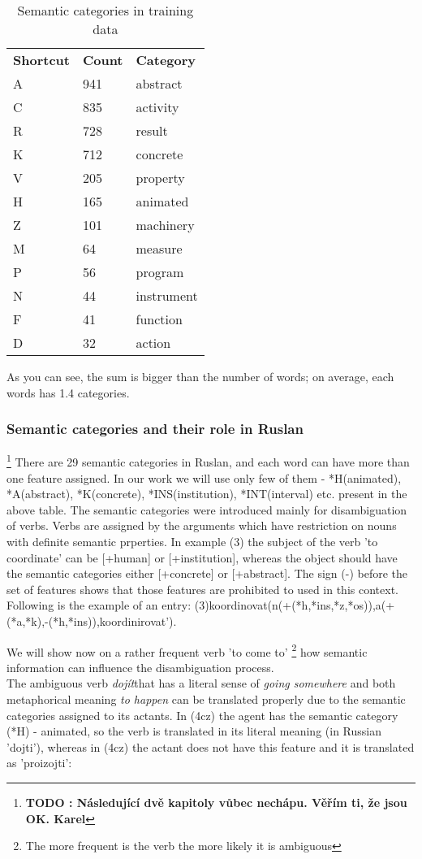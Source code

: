 \documentclass[letterpaper]{article}
\newcommand{\todofn}[1] {
 \footnote{\textbf{TODO : #1}}}
\begin{document}
\begin{table}
\begin{tabular}{|l|l|l|}
 \hline
\textbf{Shortcut} &  \textbf{Count} & \textbf{Category}\\
A & 941 & abstract \\ \hline
C & 835 & activity \\ \hline
R & 728 & result \\ \hline
K & 712 & concrete \\ \hline
V & 205 & property \\ \hline
H & 165 & animated \\ \hline
Z & 101 & machinery \\ \hline
M & 64 & measure\\ \hline
P & 56 & program \\ \hline
N & 44 & instrument \\ \hline
F & 41 & function \\ \hline
D & 32 & action \\ \hline

\end{tabular}
\caption{Semantic categories in training data}
\end{table}


As you can see, the sum is bigger than the number of words; on average, each words has 1.4 categories.


\subsubsection{Semantic categories and their role in Ruslan}
\todofn{Následující dvě kapitoly vůbec nechápu. Věřím ti, že jsou OK. Karel} 
There are 29 semantic categories in Ruslan, and each word can have more than one
feature assigned. In our work we will use only few of them - *H(animated), *A(abstract),
*K(concrete), *INS(institution), *INT(interval) etc. present in the above table.
The semantic categories were introduced mainly for disambiguation of verbs.
Verbs are assigned by the arguments which have restriction on nouns with definite semantic prperties. In example (3)
the subject of the verb 'to coordinate' can be [+human] or [+institution], whereas
the object should have the semantic categories either [+concrete] or [+abstract]. The sign (-)
before the set of features shows that those features are prohibited to used in this context.
Following is the example of an entry:
(3)koordinovat(n(+(*h,*ins,*z,*os)),a(+(*a,*k),-(*h,*ins)),koordinirovat').

We will show now on a rather frequent verb 'to come to' \footnote{The more frequent is the verb the more likely it is ambiguous} 
how semantic information can influence the disambiguation process.\\
The ambiguous verb \textit{dojít}that has a literal sense of \textit{going somewhere}
and both metaphorical meaning \textit{to happen} can be translated properly
due to the semantic categories assigned to its actants. In (4cz) the
agent has the semantic category (*H) - animated, so the verb is translated
in its literal meaning (in Russian 'dojti'), whereas in (4cz) the actant does not have this feature
and it is translated as 'proizojti':
\end{document}
